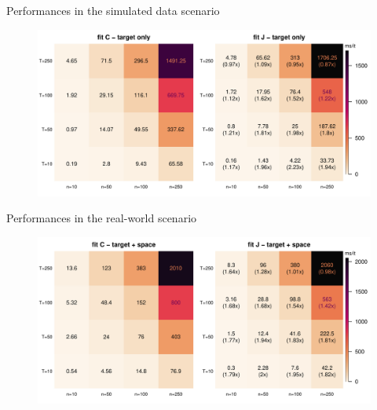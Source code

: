 \documentclass[
	11pt, %
 xcolor={dvipsnames,svgnames}
]{beamer}
\begin{document}
\begin{frame}{Performances in the simulated data scenario}
\begin{figure}[!ht]
    \centering
    \includegraphics[width=1\linewidth]{Testing/Scaling possibilities/target.pdf}
    \label{fig: scaling target}
\end{figure}
\end{frame}

\begin{frame}{Performances in the real-world scenario}
\begin{figure}[!ht]
    \centering
    \includegraphics[width=1\linewidth]{Testing/Scaling possibilities/target_space.pdf}
    \label{fig: scaling target space}
\end{figure}
\end{frame}
\end{document}
